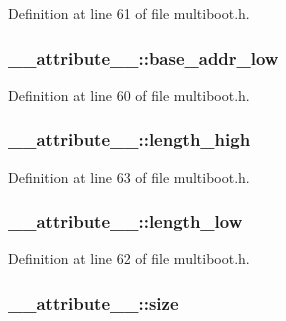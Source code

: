 Definition at line 61 of file multiboot.h.

\hypertarget{struct____attribute_____af3f9006aed492760c1dad84ea4298a7a}{
\subsubsection[{base\_\-addr\_\-low}]{ {\bf \_\-\_\-attribute\_\-\_\-::base\_\-addr\_\-low}}}
\label{struct____attribute_____af3f9006aed492760c1dad84ea4298a7a}


Definition at line 60 of file multiboot.h.

\hypertarget{struct____attribute_____a9811ef454074c38ef0488c8c81ec9556}{
\subsubsection[{length\_\-high}]{ {\bf \_\-\_\-attribute\_\-\_\-::length\_\-high}}}
\label{struct____attribute_____a9811ef454074c38ef0488c8c81ec9556}


Definition at line 63 of file multiboot.h.

\hypertarget{struct____attribute_____a7f0d4ed5675df39d8861574e0a3e239e}{
\subsubsection[{length\_\-low}]{ {\bf \_\-\_\-attribute\_\-\_\-::length\_\-low}}}
\label{struct____attribute_____a7f0d4ed5675df39d8861574e0a3e239e}


Definition at line 62 of file multiboot.h.

\hypertarget{struct____attribute_____adfda3ad54fd32b7b9d4386d915d5cfc0}{
\subsubsection[{size}]{ {\bf \_\-\_\-attribute\_\-\_\-::size}}}
\label{struct____attribute_____adfda3ad54fd32b7b9d4386d915d5cfc0}


